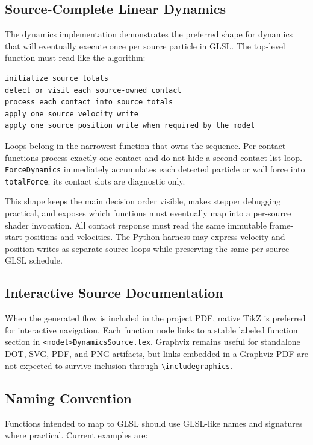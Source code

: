 \subsection{Source-Complete Linear Dynamics}

The dynamics implementation demonstrates the preferred shape for dynamics
that will eventually execute once per source particle in GLSL.  The top-level
function must read like the algorithm:

\begin{verbatim}
initialize source totals
detect or visit each source-owned contact
process each contact into source totals
apply one source velocity write
apply one source position write when required by the model
\end{verbatim}

Loops belong in the narrowest function that owns the sequence.  Per-contact
functions process exactly one contact and do not hide a second contact-list
loop.  \texttt{ForceDynamics} immediately accumulates each detected particle
or wall force into \texttt{totalForce}; its contact slots are diagnostic only.

This shape keeps the main decision order visible, makes stepper debugging
practical, and exposes which functions must eventually map into a per-source
shader invocation.  All contact response must read the same immutable
frame-start positions and velocities.  The Python harness may express velocity
and position writes as separate source loops while preserving the same
per-source GLSL schedule.

\subsection{Interactive Source Documentation}

When the generated flow is included in the project PDF, native TikZ is preferred
for interactive navigation.  Each function node links to a stable labeled
function section in \texttt{<model>DynamicsSource.tex}.  Graphviz remains useful
for standalone DOT, SVG, PDF, and PNG artifacts, but links embedded in a
Graphviz PDF are not expected to survive inclusion through
\texttt{\textbackslash includegraphics}.

\subsection{Naming Convention}

Functions intended to map to GLSL should use GLSL-like names and signatures
where practical.  Current examples are:

